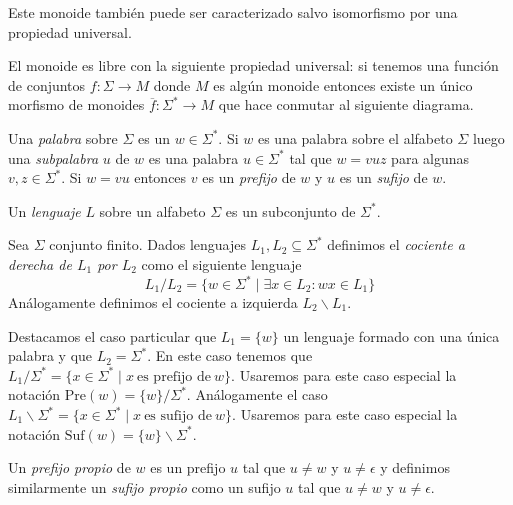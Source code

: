 \documentclass[tesis.tex]{subfiles}
\begin{document}
Este monoide también puede ser caracterizado salvo isomorfismo por una propiedad universal.

\begin{obs}
	El monoide es libre con la siguiente propiedad universal: si tenemos una función de conjuntos $f: \Sigma \to M$ donde $M$ es algún monoide entonces existe un único morfismo de monoides $\overline f: \Sigma^{*} \to M$ que hace conmutar al siguiente diagrama.	
	
	\begin{center}
	\end{center}
	
\end{obs}

Una \emph{palabra} sobre $\Sigma$ es un $w \in \Sigma^*$.
Si $w $ es una palabra sobre el alfabeto $\Sigma$ luego una \emph{subpalabra} $u$ de $w$ es una palabra $u \in \Sigma^*$ tal que $w = vuz$ para algunas $v, z \in \Sigma^*$. 
Si $w = vu$ entonces $v$ es un \emph{prefijo} de $w$ y $u$ es un \emph{sufijo} de $w$.


\begin{deff}
	Un \emph{lenguaje} $L$ sobre un alfabeto $\Sigma$ es un subconjunto de $\Sigma^*$.
\end{deff}

\begin{deff}
	Sea $\Sigma$ conjunto finito.
	Dados lenguajes $L_{1}, L_{2} \subseteq \Sigma^*$ definimos el \emph{cociente a derecha de $L_{1}$ por $L_{2}$} como el siguiente lenguaje
	\[
	L_{1}/L_{2} = \{ w \in \Sigma^* \mid \exists x \in L_{2}: wx \in L_{1}    \}
	\]
	Análogamente definimos el cociente a izquierda $L_{2} \backslash L_{1}$.
\end{deff}
Destacamos el caso particular que $L_{1} = \{w\}$ un lenguaje formado con una única palabra y que $L_{2} = \Sigma^*$.
En este caso tenemos que $L_{1}/\Sigma^* = \{  x \in \Sigma^*  \mid x \ \text{es prefijo de} \ w  \}$.
Usaremos para este caso especial la notación $ \textrm{Pre}(w) = \{w\}/\Sigma^*$.
Análogamente el caso $L_{1} \backslash \Sigma^{*} = \{  x \in \Sigma^*  \mid x \ \text{es sufijo de} \ w  \}$.
Usaremos para este caso especial la notación $ \textrm{Suf}(w) = \{w\} \backslash \Sigma^*$.


Un \emph{prefijo propio} de $w$ es un prefijo $u$ tal que $u \neq w$ y $u \neq \epsilon$ y definimos similarmente un \emph{sufijo propio} como un sufijo $u$ tal que $u \neq w$ y $u \neq \epsilon$.
\end{document}
